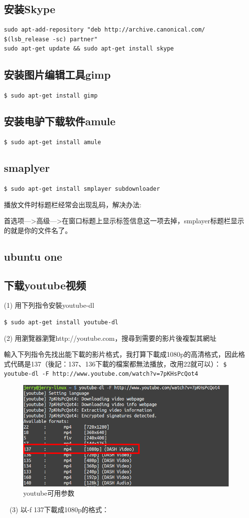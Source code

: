 \subsection{安装Skype}
\begin{verbatim}
sudo apt-add-repository "deb http://archive.canonical.com/ $(lsb_release -sc) partner"
sudo apt-get update && sudo apt-get install skype
\end{verbatim}

\subsection{安装图片编辑工具gimp}
\verb"$ sudo apt-get install gimp"

\subsection{安装电驴下载软件amule}
\verb"$ sudo apt-get install amule"

\subsection{smaplyer}
\verb"$ sudo apt-get install smplayer subdownloader"

播放文件时标题栏经常会出现乱码，解决办法:

首选项—>高级—>在窗口标题上显示标签信息这一项去掉，smplayer标题栏显示的就是你的文件名了。

\subsection{ubuntu one}

\subsection{下载youtube视频}
(1) 用下列指令安裝youtube-dl

\verb"$ sudo apt-get install youtube-dl"

(2) 用瀏覽器瀏覽http://youtube.com，搜尋到需要的影片後複製其網址

輸入下列指令先找出能下載的影片格式，我打算下載成1080p的高清格式，因此格式代碼是137（後記：137、136下載的檔案都無法播放，改用22就可以）：
\verb"$ youtube-dl -F http://www.youtube.com/watch?v=7pKHsPcQot4"
\begin{figure}
\centering\includegraphics[scale=0.5]{figures/youtube.png}
\caption{youtube可用参数}\label{youtube1}
\end{figure} 
(3) 以-f 137下載成1080p的格式：

